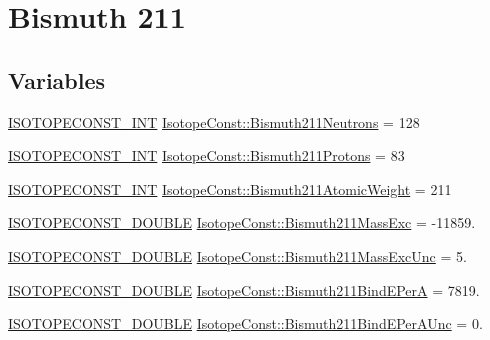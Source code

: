 \hypertarget{group___isotope_const-_bismuth-_bi211}{}\section{Bismuth 211}
\label{group___isotope_const-_bismuth-_bi211}
\subsection*{Variables}
\begin{DoxyCompactItemize}
\item 
\mbox{\hyperlink{group___isotope_const-_macros_ga5f18360b3e99483a35c32d789e62621c}{I\+S\+O\+T\+O\+P\+E\+C\+O\+N\+S\+T\+\_\+\+I\+NT}} \mbox{\hyperlink{group___isotope_const-_bismuth-_bi211_ga7ab071d217f4ad2d059486fc560ea0ee}{Isotope\+Const\+::\+Bismuth211\+Neutrons}} = 128
\item 
\mbox{\hyperlink{group___isotope_const-_macros_ga5f18360b3e99483a35c32d789e62621c}{I\+S\+O\+T\+O\+P\+E\+C\+O\+N\+S\+T\+\_\+\+I\+NT}} \mbox{\hyperlink{group___isotope_const-_bismuth-_bi211_gad62ffeac20ad32a38d900b40eedc2ebe}{Isotope\+Const\+::\+Bismuth211\+Protons}} = 83
\item 
\mbox{\hyperlink{group___isotope_const-_macros_ga5f18360b3e99483a35c32d789e62621c}{I\+S\+O\+T\+O\+P\+E\+C\+O\+N\+S\+T\+\_\+\+I\+NT}} \mbox{\hyperlink{group___isotope_const-_bismuth-_bi211_ga39357396d1a3ee3cc18cebc1c1457486}{Isotope\+Const\+::\+Bismuth211\+Atomic\+Weight}} = 211
\item 
\mbox{\hyperlink{group___isotope_const-_macros_ga8f45a7272ce02c0b4c65c44636ed719a}{I\+S\+O\+T\+O\+P\+E\+C\+O\+N\+S\+T\+\_\+\+D\+O\+U\+B\+LE}} \mbox{\hyperlink{group___isotope_const-_bismuth-_bi211_ga090e9718f6dea92a9d66f017815e438f}{Isotope\+Const\+::\+Bismuth211\+Mass\+Exc}} = -\/11859.
\item 
\mbox{\hyperlink{group___isotope_const-_macros_ga8f45a7272ce02c0b4c65c44636ed719a}{I\+S\+O\+T\+O\+P\+E\+C\+O\+N\+S\+T\+\_\+\+D\+O\+U\+B\+LE}} \mbox{\hyperlink{group___isotope_const-_bismuth-_bi211_ga4e54c6a6ff9528c23f8aca2ce7d290ce}{Isotope\+Const\+::\+Bismuth211\+Mass\+Exc\+Unc}} = 5.
\item 
\mbox{\hyperlink{group___isotope_const-_macros_ga8f45a7272ce02c0b4c65c44636ed719a}{I\+S\+O\+T\+O\+P\+E\+C\+O\+N\+S\+T\+\_\+\+D\+O\+U\+B\+LE}} \mbox{\hyperlink{group___isotope_const-_bismuth-_bi211_ga96516b304b174cb55634c54cf8fbd822}{Isotope\+Const\+::\+Bismuth211\+Bind\+E\+PerA}} = 7819.
\item 
\mbox{\hyperlink{group___isotope_const-_macros_ga8f45a7272ce02c0b4c65c44636ed719a}{I\+S\+O\+T\+O\+P\+E\+C\+O\+N\+S\+T\+\_\+\+D\+O\+U\+B\+LE}} \mbox{\hyperlink{group___isotope_const-_bismuth-_bi211_gabce0cc8fe374ac8e493ffb5001936f57}{Isotope\+Const\+::\+Bismuth211\+Bind\+E\+Per\+A\+Unc}} = 0.

\end{DoxyCompactItemize}

